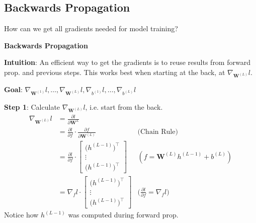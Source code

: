 \subsection{Backwards Propagation}

How can we get all gradients needed for model training?

 \textbf{Backwards Propagation}

\textbf{Intuition}: An efficient way to get the gradients is to reuse results from forward prop. and previous steps. This works best when starting at the back, at $\nabla_{\textbf{W}^{(L)}}l$.

\textbf{Goal}: $\nabla_{\textbf{W}^{(1)}}l,\ldots,\nabla_{\textbf{W}^{(L)}} l, \nabla_{b^{(1)}}l,\ldots,\nabla_{b^{(L)}}l$

\textbf{Step 1}: Calculate $\nabla_{\textbf{W}^{(L)}}l$, i.e. start from the back.
\begin{align*}
    \nabla_{\textbf{W}^{(L)}}l  &= \frac{\partial l}{\partial \textbf{W}^{L}} \\
                                &= \frac{\partial l}{\partial f}\cdot\frac{\partial f}{\partial \textbf{W}^{(L)}} & \text{(Chain Rule)} \\
                                &= \frac{\partial l}{\partial f}\cdot\begin{bmatrix}
                                    \bigl( h^{(L-1)} \bigr)^\top    \\
                                    \vdots                          \\
                                    \bigl( h^{(L-1)} \bigr)^\top    
                                \end{bmatrix}                                                                     & (f = \textbf{W}^{(L)}h^{(L-1)} + b^{(L)}) \\
                                &= \nabla_f l \cdot\begin{bmatrix}
                                    \bigl( h^{(L-1)} \bigr)^\top    \\
                                    \vdots                          \\
                                    \bigl( h^{(L-1)} \bigr)^\top    
                                \end{bmatrix}                                                                     & \Biggl(\frac{\partial l}{\partial f} = \nabla_f l\Biggr)
\end{align*}
Notice how $h^{(L-1)}$ was computed during forward prop.

